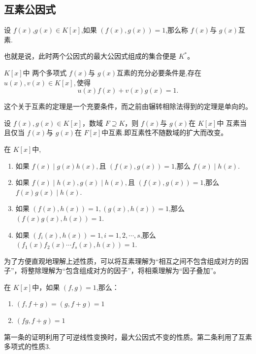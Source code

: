 \subsection{互素公因式}
\begin{mydef}
    设 $f(x)$,$g(x)\in K[x]$,如果 $(f(x),g(x))=1$,那么称 $f(x)$与 $g(x)$互素.
\end{mydef}
\begin{myrmk}
    也就是说，此时两个公因式的最大公因式组成的集合便是 $K^*$。
\end{myrmk}
\begin{mythm}
    $K[x]$中 两个多项式 $f(x)$与 $g(x)$互素的充分必要条件是,存在 $u(x),v(x)\in K[x],$使得
    \[u(x)f(x)+v(x)g(x)=1.\]
\end{mythm}
\begin{myrmk}
    这个关于互素的定理是一个充要条件，而之前由辗转相除法得到的定理是单向的。
\end{myrmk}
\begin{mycor}
    设 $f(x),g(x)\in K[x]$，数域 $F\supseteq K$，则 $f(x)$与 $g(x)$在 $K[x]$中
    互素当且仅当 $f(x)$与 $g(x)$在 $F[x]$中互素.即互素性不随数域的扩大而改变。
\end{mycor}
\begin{myproperty}
    在 $K[x]$中,
\begin{enumerate}
\item 如果 $f(x)\mid g(x)h(x),$且 $(f(x),g(x))=1$,那么 $f(x)\mid h(x).$
\item 如果 $f(x)\mid h(x),g(x)\mid h(x),$且 $(f(x),g(x))=1$,那么 $f(x)g(x)\mid h(x)$.
\item 如果 $(f(x),h(x))=1,(g(x),h(x))=1$,那么 $(f(x)g(x),h(x))=1.$
\item 如果 $(f_i(x),h(x))=1,i=1,2,\cdots,s$,那么 $(f_1(x)f_2(x)\cdots f_s(x),h(x))=1.$
\end{enumerate}
\end{myproperty}
\begin{myrmk}
    为了方便直观地理解上述性质，可以将互素理解为“相互之间不包含组成对方的因子”，将整除理解为“包含组成对方的因子”，将相乘理解为“因子叠加”。
\end{myrmk}
\begin{myprop}
    在 $K[x]$中，如果 $(f,g)=1$,那么：
    \begin{enumerate}
        \item $(f,f+g)=(g,f+g)=1$
        \item $(fg,f+g)=1$
    \end{enumerate}
\end{myprop}
\begin{myrmk}
    第一条的证明利用了可逆线性变换时，最大公因式不变的性质。第二条利用了互素多项式的性质3.
\end{myrmk}
